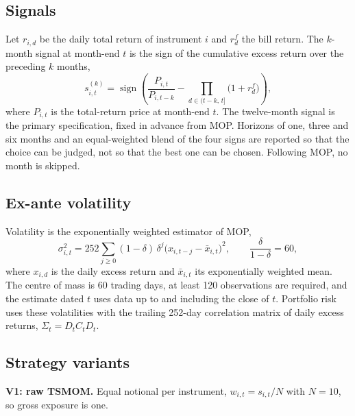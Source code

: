 \documentclass[11pt,a4paper]{article}
\begin{document}
\subsection{Signals}

Let $r_{i,d}$ be the daily total return of instrument $i$ and $r^f_d$ the bill return. The $k$-month signal at month-end $t$ is the sign of the cumulative excess return over the preceding $k$ months,
\begin{equation}
s^{(k)}_{i,t} = \operatorname{sign}\!\left( \frac{P_{i,t}}{P_{i,t-k}} - \prod_{d \in (t-k,\,t]} \bigl(1 + r^f_d\bigr) \right),
\end{equation}
where $P_{i,t}$ is the total-return price at month-end $t$. The twelve-month signal is the primary specification, fixed in advance from MOP. Horizons of one, three and six months and an equal-weighted blend of the four signs are reported so that the choice can be judged, not so that the best one can be chosen. Following MOP, no month is skipped.

\subsection{Ex-ante volatility}

Volatility is the exponentially weighted estimator of MOP,
\begin{equation}
\sigma^2_{i,t} = 252 \sum_{j \ge 0} (1-\delta)\,\delta^{j} \bigl(x_{i,t-j} - \bar{x}_{i,t}\bigr)^2, \qquad \frac{\delta}{1-\delta} = 60,
\end{equation}
where $x_{i,d}$ is the daily excess return and $\bar{x}_{i,t}$ its exponentially weighted mean. The centre of mass is 60 trading days, at least 120 observations are required, and the estimate dated $t$ uses data up to and including the close of $t$. Portfolio risk uses these volatilities with the trailing 252-day correlation matrix of daily excess returns, $\Sigma_t = D_t C_t D_t$.

\subsection{Strategy variants}
\label{sec:vt}

\textbf{V1: raw TSMOM.} Equal notional per instrument, $w_{i,t} = s_{i,t}/N$ with $N = 10$, so gross exposure is one.
\end{document}
